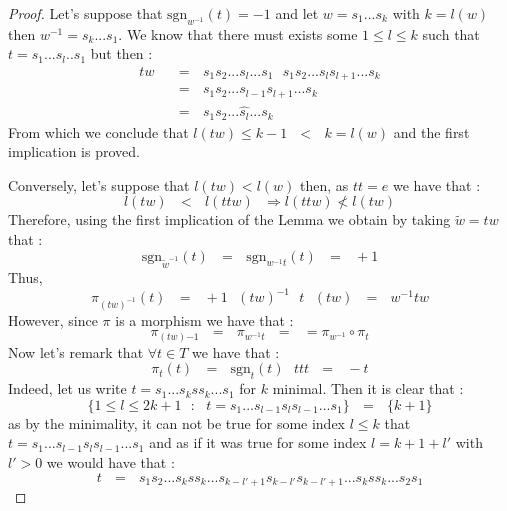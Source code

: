 \documentclass[envcountsame,envcountchap]{svmono}
\newcommand{\qq}{\text{ }}
\begin{document}
\begin{proof}
	Let's suppose that $\mbox{sgn}_{w^{-1}}(t)=-1$ and let $w=s_1...s_k$ with $k=l(w)$ then $w^{-1}=s_k...s_1$. We know that there must exists some $1\leq l\leq k$ such that $t=s_1...s_l..s_1$ but then :
	\begin{equation}
	\begin{split}
	tw\qq&=\qq s_1s_2...s_l...s_1\qq s_1s_2...s_ls_{l+1}...s_k\\
	&=\qq s_1s_2...s_{l-1}s_{l+1}...s_k\\
	&=\qq s_1s_2...\hat{s_l}...s_k
	\end{split}
	\end{equation}
	From which we conclude that $l(tw)\leq k-1\qq <\qq k=l(w)$ and the first implication is proved.

	Conversely, let's suppose that $l(tw)<l(w)$ then, as $tt=e$ we have that :
	\begin{equation}
	l(tw)\qq <\qq l(ttw)\qq \Rightarrow l(ttw)\not<l(tw)
	\end{equation}
	Therefore, using the first implication of the Lemma we obtain by taking $\tilde{w}=tw$ that :
	\begin{equation}
	\mbox{sgn}_{\tilde{w}^{-1}}(t)\qq=\qq \mbox{sgn}_{w^{-1}t}(t)\qq =\qq+1
	\end{equation}
	Thus,
	\begin{equation}
	\pi_{(tw)^{-1}}(t)\qq=\qq +1 \qq (tw)^{-1}\qq t\qq(tw)\qq=\qq w^{-1}tw
	\end{equation}
	However, since $\pi$ is a morphism we have that :
	\begin{equation}\label{pi est un homo}
	\pi_{(tw){-1}}\qq=\qq\pi_{w^{-1}t}\qq=\qq =\pi_{w^{-1}}\circ\pi_t
	\end{equation}
	Now let's remark that $\forall t\in T$ we have that :
	\begin{equation}
	\pi_t(t)\qq=\qq \mbox{sgn}_t(t)\qq ttt\qq=\qq -t
	\end{equation}
	Indeed, let us write $t=s_1...s_kss_k...s_1$ for $k$ minimal. Then it is clear that :
	\begin{equation}\label{le signe de t de t}
	\{1\leq l\leq 2k+1\qq :\qq t=s_1...s_{l-1}s_l s_{l-1}...s_1\}\qq=\qq \{k+1\}
	\end{equation}
	as by the minimality, it can not be true for some index $l\leq k$ that $t=s_1...s_{l-1}s_l s_{l-1}...s_1$ and as if it was true for some index $l= k+1+l'$ with $l'>0$ we would have that  :
	\begin{equation}
	t\qq=\qq s_1s_2...s_kss_k...s_{k-l'+1}s_{k-l'}s_{k-l'+1}...s_kss_k...s_2s_1

\end{equation}
\end{proof}
\end{document}
